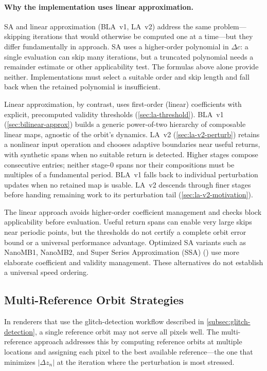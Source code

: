 \paragraph{Why the implementation uses linear approximation.}
SA and linear approximation (BLA~v1, LA~v2) address the same
problem---skipping iterations that would otherwise be computed one at a
time---but they differ fundamentally in approach.  SA uses a
higher-order polynomial in $\Delta c$: a single evaluation can skip many
iterations, but a truncated polynomial needs a remainder estimate or other
applicability test.  The formulas above alone provide neither.  Implementations
must select a suitable order and skip length and fall back when the retained
polynomial is insufficient.

Linear approximation, by contrast, uses first-order (linear)
coefficients with explicit, precomputed validity thresholds
(\cref{sec:la-threshold}). BLA~v1 (\cref{sec:bilinear-approx}) builds a
generic power-of-two hierarchy of composable linear maps, agnostic of
the orbit's dynamics. LA~v2 (\cref{sec:la-v2-perturb}) retains a
nonlinear input operation and chooses adaptive boundaries near useful
returns, with synthetic spans when no suitable return is detected.
Higher stages compose consecutive entries; neither stage-0 spans nor
their compositions must be multiples of a fundamental period.
BLA~v1 falls back to individual perturbation updates when no retained
map is usable. LA~v2 descends through finer stages before handing
remaining work to its perturbation tail (\cref{sec:la-v2-motivation}).

The linear approach avoids higher-order coefficient management and
checks block applicability before evaluation. Useful return spans can
enable very large skips near periodic points, but the thresholds do
not certify a complete orbit error bound or a universal performance
advantage. Optimized SA variants such as NanoMB1,
NanoMB2, and Super Series Approximation (SSA)
(\cite{KallesFraktaler}) use more elaborate coefficient and validity
management.  These alternatives do not establish a universal speed ordering.

\subsection{Multi-Reference Orbit Strategies}
\label{subsec:multi-reference}

In renderers that use the glitch-detection workflow described in
\cref{subsec:glitch-detection}, a single reference orbit may not serve
all pixels well.  The multi-reference approach addresses this by
computing reference orbits at multiple locations and assigning each pixel
to the best available reference---the one that minimizes $|\Delta z_n|$
at the iteration where the perturbation is most stressed.

